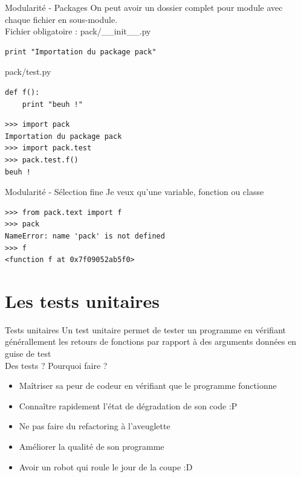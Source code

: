 \documentclass{beamer}
\begin{document}
\begin{frame}[fragile]{Modularité - Packages}
On peut avoir un dossier complet pour module avec chaque fichier en sous-module.\\
Fichier obligatoire : pack/\_\_init\_\_.py
\begin{lstlisting}
print "Importation du package pack"
\end{lstlisting}
pack/test.py
\begin{lstlisting}
def f():
    print "beuh !"
\end{lstlisting}
\begin{lstlisting}
>>> import pack
Importation du package pack
>>> import pack.test
>>> pack.test.f()
beuh !
\end{lstlisting}

\end{frame}

\begin{frame}[fragile]{Modularité - Sélection fine}
Je veux qu'une variable, fonction ou classe
\begin{lstlisting}
>>> from pack.text import f
>>> pack
NameError: name 'pack' is not defined
>>> f
<function f at 0x7f09052ab5f0>
\end{lstlisting}
\end{frame}



\section{Les tests unitaires}

\begin{frame}[fragile]{Tests unitaires}
Un test unitaire permet de tester un programme en vérifiant générallement les retours de fonctions par rapport à des arguments données en guise de test\\
Des tests ? Pourquoi faire ?
\begin{itemize}
 \item Maîtriser sa peur de codeur en vérifiant que le programme fonctionne
 \item Connaître rapidement l'état de dégradation de son code :P
 \item Ne pas faire du refactoring à l'aveuglette
 \item Améliorer la qualité de son programme
 \item Avoir un robot qui roule le jour de la coupe :D
\end{itemize}
\end{frame}
\end{document}
